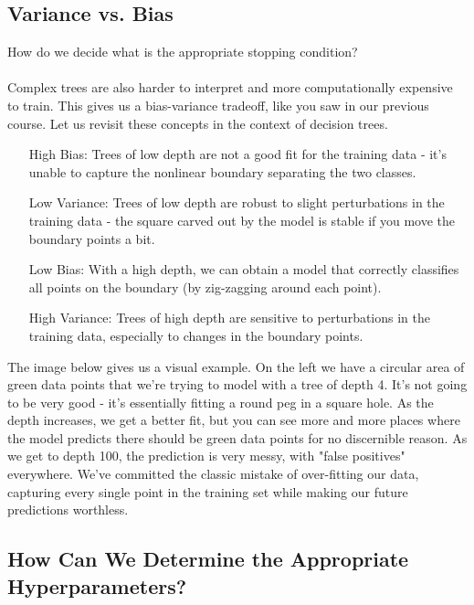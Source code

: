 \documentclass[11pt,a4paper]{report}
\begin{document}
\subsection{Variance vs. Bias}
How do we decide what is the appropriate stopping condition?\\\\
Complex trees are also harder to interpret and more computationally expensive to train. This gives us a bias-variance tradeoff, like you saw in our previous course. Let us revisit these concepts in the context of decision trees.
\begin{itemize}
\item[High Bias:]Trees of low depth are not a good fit for the training data - it’s unable to capture the nonlinear boundary separating the two classes.
\item[Low Variance:]Trees of low depth are robust to slight perturbations in the training data - the square carved out by the model is stable if you move the boundary points a bit.
\item[Low Bias:] With a high depth, we can obtain a model that correctly classifies all points on the boundary (by zig-zagging around each point).
\item[High Variance:]Trees of high depth are sensitive to perturbations in the training data, especially to changes in the boundary points.
\end{itemize}
The image below gives us a visual example. On the left we have a circular area of green data points that we're trying to model with a tree of depth 4. It's not going to be very good - it's essentially fitting a round peg in a square hole. As the depth increases, we get a better fit, but you can see more and more places where the model predicts there should be green data points for no discernible reason. As we get to depth 100, the prediction is very messy, with "false positives" everywhere. We've committed the classic mistake of over-fitting our data, capturing every single point in the training set while making our future predictions worthless.\\
\subsection*{How Can We Determine the Appropriate Hyperparameters?}
\end{document}
